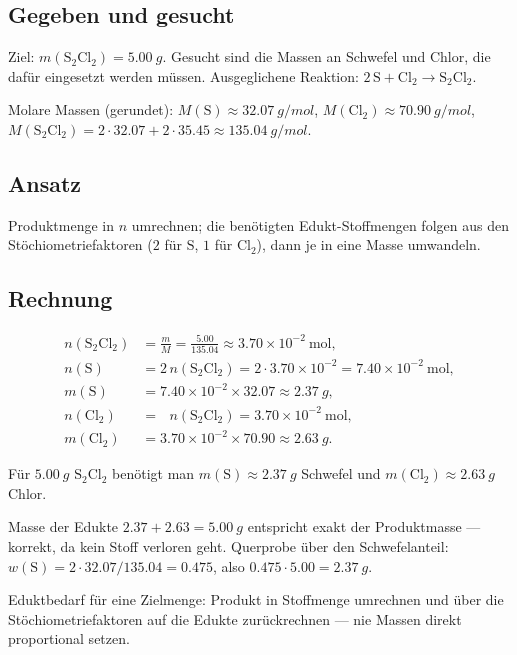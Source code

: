 
\subsection*{Gegeben und gesucht}
Ziel: $m(\mathrm{S_2Cl_2}) = \qty{5.00}{g}$. Gesucht sind die Massen an
Schwefel und Chlor, die dafür eingesetzt werden müssen. Ausgeglichene
Reaktion: $2\,\mathrm{S} + \mathrm{Cl_2} \rightarrow \mathrm{S_2Cl_2}$.

Molare Massen (gerundet): $M(\mathrm{S}) \approx \qty{32.07}{g/mol}$,
$M(\mathrm{Cl_2}) \approx \qty{70.90}{g/mol}$,
$M(\mathrm{S_2Cl_2}) = 2\cdot 32.07 + 2\cdot 35.45 \approx
\qty{135.04}{g/mol}$.

\subsection*{Ansatz}
Produktmenge in $n$ umrechnen; die benötigten Edukt-Stoffmengen folgen aus den
Stöchiometriefaktoren ($2$ für $\mathrm{S}$, $1$ für $\mathrm{Cl_2}$), dann
je in eine Masse umwandeln.

\subsection*{Rechnung}
\begin{align*}
  n(\mathrm{S_2Cl_2}) &= \frac{m}{M} = \frac{5.00}{135.04}
  \approx 3.70\times10^{-2}\ \mathrm{mol}, \\[2pt]
  n(\mathrm{S}) &= 2\,n(\mathrm{S_2Cl_2}) = 2\cdot 3.70\times10^{-2}
  = 7.40\times10^{-2}\ \mathrm{mol}, \\
  m(\mathrm{S}) &= 7.40\times10^{-2} \times 32.07
  \approx \qty{2.37}{g}, \\[2pt]
  n(\mathrm{Cl_2}) &= \phantom{2\,}n(\mathrm{S_2Cl_2})
  = 3.70\times10^{-2}\ \mathrm{mol}, \\
  m(\mathrm{Cl_2}) &= 3.70\times10^{-2} \times 70.90
  \approx \qty{2.63}{g}.
\end{align*}

\begin{ergebnis}
Für $\qty{5.00}{g}$ $\mathrm{S_2Cl_2}$ benötigt man
$m(\mathrm{S}) \approx \qty{2.37}{g}$ Schwefel und
$m(\mathrm{Cl_2}) \approx \qty{2.63}{g}$ Chlor.
\end{ergebnis}

\begin{kontrolle}
Masse der Edukte $2.37 + 2.63 = \qty{5.00}{g}$ entspricht exakt der
Produktmasse --- korrekt, da kein Stoff verloren geht. Querprobe über den
Schwefelanteil: $w(\mathrm{S}) = 2\cdot 32.07/135.04 = 0.475$, also
$0.475\cdot 5.00 = \qty{2.37}{g}$.
\end{kontrolle}

\begin{merksatz}
Eduktbedarf für eine Zielmenge: Produkt in Stoffmenge umrechnen und über die
Stöchiometriefaktoren auf die Edukte zurückrechnen --- nie Massen direkt
proportional setzen.
\end{merksatz}
